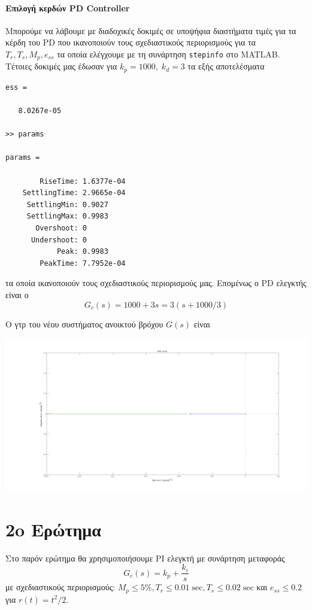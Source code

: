 \documentclass[a4paper,oneside, 10pt]{article}
\begin{document}
\paragraph{Επιλογή κερδών PD Controller} 
Μπορούμε να λάβουμε με διαδοχικές δοκιμές σε υποψήφια διαστήματα τιμές για τα κέρδη του PD που ικανοποιούν τους σχεδιαστικούς περιορισμούς για τα $T_r, T_s, M_p, e_{ss}$ τα οποία ελέγχουμε με τη συνάρτηση \texttt{stepinfo} στο MATLAB. Τέτοιες δοκιμές μας έδωσαν για $k_p = 1000, \; k_d = 3$ τα εξής αποτελέσματα
\begin{verbatim}
ess =

   8.0267e-05

>> params

params = 

        RiseTime: 1.6377e-04
    SettlingTime: 2.9665e-04
     SettlingMin: 0.9027
     SettlingMax: 0.9983
       Overshoot: 0
      Undershoot: 0
            Peak: 0.9983
        PeakTime: 7.7952e-04

\end{verbatim}  

τα οποία ικανοποιούν τους σχεδιαστικούς περιορισμούς μας. Επομένως ο PD ελεγκτής είναι ο $$G_c(s) = 1000 + 3s = 3 (s + 1000 / 3)$$

Ο γτρ του νέου συστήματος ανοικτού βρόχου $G(s)$ είναι

\includegraphics[width=\textwidth]{pd_rlocus.png}
 
\section*{2o Ερώτημα} 

Στο παρόν ερώτημα θα χρησιμοποιήσουμε PI ελεγκτή με συνάρτηση μεταφοράς $$G_c(s) = k_p + \frac {k_i} s$$ με σχεδιαστικούς περιορισμούς: $M_p \le 5\%, T_r \le 0.01 \; \mathrm {sec}, T_s \le 0.02 \; \mathrm{sec}$ και $e_{ss} \le 0.2$ για $r(t) = t^2 / 2$. 
\end{document}
